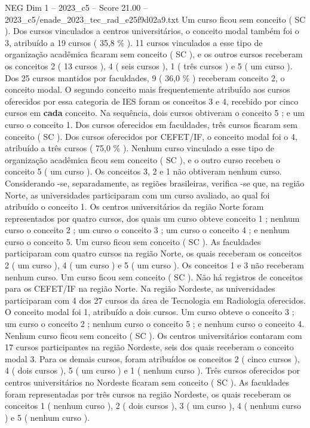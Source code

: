 \begin{textsample}{NEG Dim 1 – 2023\_c5 – Score 21.00 – 2023\_c5/enade\_2023\_tec\_rad\_e25f9d02a9.txt}
Um curso ficou sem conceito ( SC ).
Dos cursos vinculados a centros universitários, o conceito modal também foi o 3, atribuído a 19 cursos ( 35,8 \% ). 11 cursos vinculados a esse tipo de organização acadêmica ficaram sem conceito ( SC ), e os outros cursos receberam os conceitos 2 ( 13 cursos ), 4 ( seis cursos ), 1 ( três cursos ) e 5 ( um curso ).
Dos 25 cursos mantidos por faculdades, 9 ( 36,0 \% ) receberam conceito 2, o conceito modal.
O segundo conceito mais frequentemente atribuído aos cursos oferecidos por essa categoria de IES foram os conceitos 3 e 4, recebido por cinco cursos em \textbf{cada} conceito.
Na sequência, dois cursos obtiveram o conceito 5 ; e um curso o conceito 1.
Dos cursos oferecidos em faculdades, três cursos ficaram sem conceito ( SC ).
Dos cursos oferecidos por CEFET/IF, o conceito modal foi o 4, atribuído a três cursos ( 75,0 \% ).
Nenhum curso vinculado a esse tipo de organização acadêmica ficou sem conceito ( SC ), e o outro curso recebeu o conceito 5 ( um curso ).
Os conceitos 3, 2 e 1 não obtiveram nenhum curso.
Considerando -se, separadamente, as regiões brasileiras, verifica -se que, na região Norte, as universidades participaram com um curso avaliado, ao qual foi atribuído o conceito 1.
Os centros universitários da região Norte foram representados por quatro cursos, dos quais um curso obteve conceito 1 ; nenhum curso o conceito 2 ; um curso o conceito 3 ; um curso o conceito 4 ; e nenhum curso o conceito 5.
Um curso ficou sem conceito ( SC ).
As faculdades participaram com quatro cursos na região Norte, os quais receberam os conceitos 2 ( um curso ), 4 ( um curso ) e 5 ( um curso ).
Os conceitos 1 e 3 não receberam nenhum curso.
Um curso ficou sem conceito ( SC ).
Não há registros de conceitos para os CEFET/IF na região Norte.
Na região Nordeste, as universidades participaram com 4 dos 27 cursos da área de Tecnologia em Radiologia oferecidos.
O conceito modal foi 1, atribuído a dois cursos.
Um curso obteve o conceito 3 ; um curso o conceito 2 ; nenhum curso o conceito 5 ; e nenhum curso o conceito 4.
Nenhum curso ficou sem conceito ( SC ).
Os centros universitários contaram com 17 cursos participantes na região Nordeste, seis dos quais receberam o conceito modal 3.
Para os demais cursos, foram atribuídos os conceitos 2 ( cinco cursos ), 4 ( dois cursos ), 5 ( um curso ) e 1 ( nenhum curso ).
Três cursos oferecidos por centros universitários no Nordeste ficaram sem conceito ( SC ).
As faculdades foram representadas por três cursos na região Nordeste, os quais receberam os conceitos 1 ( nenhum curso ), 2 ( dois cursos ), 3 ( um curso ), 4 ( nenhum curso ) e 5 ( nenhum curso ).

\end{textsample}
